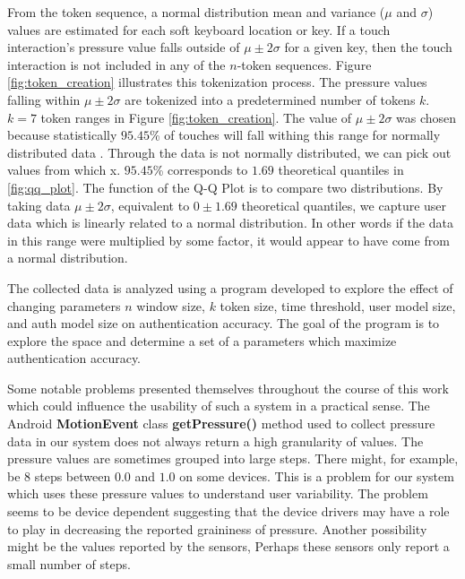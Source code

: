 
From the token sequence,
a normal distribution mean and variance ($\mu$ and $\sigma$) 
values are estimated for each soft keyboard location or key.
%
If a touch interaction's pressure value falls outside of
$\mu \pm 2\sigma$ for a given key, 
then the touch interaction is not included in any of the $n$-token sequences. 
Figure \ref{fig:token_creation} illustrates 
this tokenization process.
The pressure values falling within $\mu \pm 2\sigma$ are tokenized
into a predetermined number of tokens $k$. 
$k=7$ token ranges in Figure \ref{fig:token_creation}.
The value of $\mu \pm 2\sigma$ was chosen because statistically $95.45$\% of touches 
will fall withing this range for normally distributed data \cite{threesigmarule}.
%
Through the data is not normally distributed,
we can pick out values from which x.
$95.45$\% corresponds to $1.69$ theoretical quantiles in \ref{fig:qq_plot}.
%
The function of the Q-Q Plot is to 
compare two distributions.
By taking data $\mu \pm 2\sigma$,
equivalent to $0 \pm 1.69$ theoretical quantiles,
we capture user data which is
linearly related to a normal distribution.
In other words if the data in this range
were multiplied by some factor,
it would appear to have come from a normal distribution.


The collected data is analyzed using a program
developed to explore the effect of changing
parameters
$n$ window size, $k$ token size, time threshold,
user model size, and auth model size on
authentication accuracy.
%
The goal of the program is to
explore the space and determine a
set of a parameters which maximize authentication accuracy.

Some notable problems presented themselves
throughout the course of this work
which could influence the usability of such a 
system in a practical sense.
%
The Android \textbf{MotionEvent} class \textbf{getPressure()} method
used to collect pressure data in our system
does not always return a high granularity of values.
The pressure values are sometimes grouped
into large steps.
There might, for example,
be $8$ steps between $0.0$ and $1.0$ on some devices.
This is a problem for our system which uses
these pressure values to understand user variability.
%
The problem seems to be device dependent
suggesting that the device drivers may have a role to play
in decreasing the reported graininess of pressure.
Another possibility might be the values
reported by the sensors,
Perhaps these sensors only report a small number of steps.

